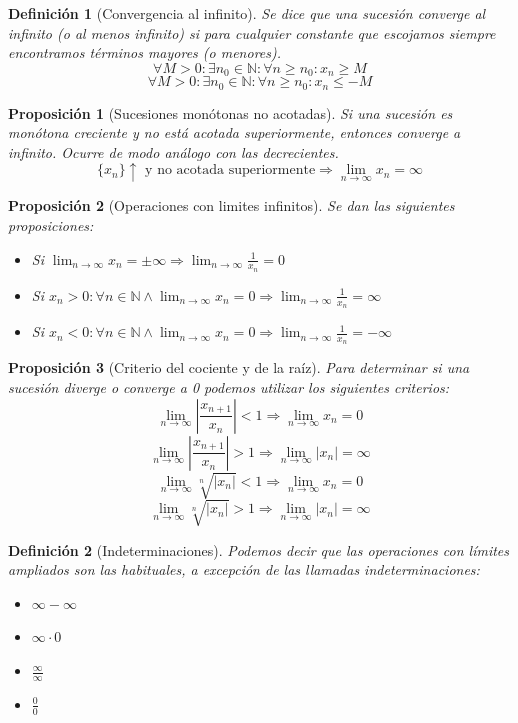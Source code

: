 \documentclass[10pt,a4paper,openright]{book}
\newtheorem{proposicion}{Proposición}[chapter]
\newtheorem{definicion}{Definición}[chapter]
\begin{document}
\begin{definicion}[Convergencia al infinito]
Se dice que una sucesión converge al infinito (o al menos infinito) si para cualquier constante que escojamos siempre encontramos términos mayores (o menores).
$$\forall M>0: \exists n_0\in \mathbb N: \forall n\geq n_0: x_n\geq M$$
$$\forall M>0: \exists n_0\in \mathbb N: \forall n\geq n_0: x_n\leq -M$$
\end{definicion}

\begin{proposicion}[Sucesiones monótonas no acotadas]
Si una sucesión es monótona creciente y no está acotada superiormente, entonces converge a infinito. Ocurre de modo análogo con las decrecientes.
$$\{x_n\}\uparrow \mbox{ y no acotada superiormente}\Rightarrow \lim_{n\rightarrow \infty}x_n=\infty$$
\end{proposicion}

\begin{proposicion}[Operaciones con limites infinitos]
Se dan las siguientes proposiciones:
\begin{itemize}
\item Si $\lim_{n\rightarrow \infty}x_n=\pm\infty\Rightarrow \lim_{n\rightarrow \infty}\frac{1}{x_n}=0$
\item Si $x_n>0: \forall n\in \mathbb N\wedge \lim_{n\rightarrow \infty}x_n=0\Rightarrow \lim_{n\rightarrow \infty}\frac{1}{x_n}=\infty$
\item Si $x_n<0: \forall n\in \mathbb N\wedge \lim_{n\rightarrow \infty}x_n=0\Rightarrow \lim_{n\rightarrow \infty}\frac{1}{x_n}=-\infty$
\end{itemize}
\end{proposicion}

\begin{proposicion}[Criterio del cociente y de la raíz]
Para determinar si una sucesión diverge o converge a 0 podemos utilizar los siguientes criterios:
$$\lim_{n\rightarrow \infty}\left|\frac{x_{n+1}}{x_n}\right|<1\Rightarrow \lim_{n\rightarrow \infty} x_n=0$$
$$\lim_{n\rightarrow \infty}\left|\frac{x_{n+1}}{x_n}\right|>1\Rightarrow \lim_{n\rightarrow \infty} |x_n|=\infty$$
$$\lim_{n\rightarrow \infty}\sqrt[n]{|x_n|}<1\Rightarrow \lim_{n\rightarrow \infty} x_n=0$$
$$\lim_{n\rightarrow \infty}\sqrt[n]{|x_n|}>1\Rightarrow \lim_{n\rightarrow \infty} |x_n|=\infty$$
\end{proposicion}

\begin{definicion}[Indeterminaciones]
Podemos decir que las operaciones con límites ampliados son las habituales, a excepción de las llamadas indeterminaciones:
\begin{itemize}
\item $\infty -\infty$
\item $\infty \cdot 0$
\item $\frac{\infty}{\infty}$
\item $\frac{0}{0}$
\end{itemize}
\end{definicion}
\end{document}
